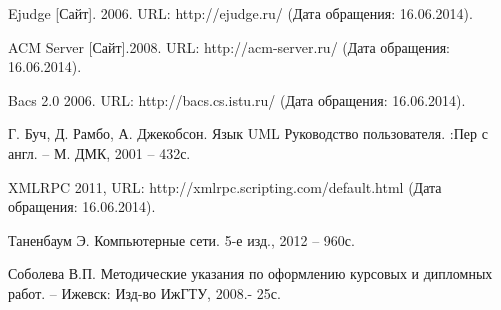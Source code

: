 \begin{thebibliography}{9}

Ejudge [Сайт]. 2006. URL: http://ejudge.ru/ (Дата обращения: 16.06.2014).

ACM Server [Сайт].2008. URL: http://acm-server.ru/ (Дата обращения: 16.06.2014).

Bacs 2.0 2006. URL: http://bacs.cs.istu.ru/ (Дата обращения: 16.06.2014).

Г. Буч, Д. Рамбо, А. Джекобсон. Язык UML Руководство пользователя. :Пер с англ. – М. ДМК, 2001 – 432с.

XMLRPC 2011, URL: http://xmlrpc.scripting.com/default.html (Дата обращения: 16.06.2014).

Таненбаум Э. Компьютерные сети. 5-е изд., 2012 -- 960с.

Соболева В.П. Методические указания по оформлению курсовых и дипломных работ. – Ижевск: Изд-во ИжГТУ, 2008.- 25с.

\end{thebibliography}
